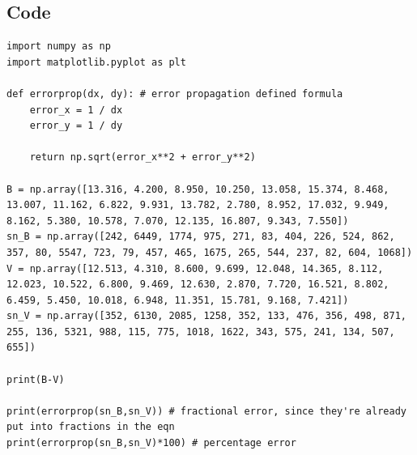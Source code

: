 \documentclass[12pt]{article}
\begin{document}
\subsection*{Code}

%

\begin{minipage}{\linewidth}
\captionsetup{hypcap=false}

\begin{mintedbox}
\begin{verbatim}
import numpy as np
import matplotlib.pyplot as plt

def errorprop(dx, dy): # error propagation defined formula
    error_x = 1 / dx
    error_y = 1 / dy

    return np.sqrt(error_x**2 + error_y**2)

B = np.array([13.316, 4.200, 8.950, 10.250, 13.058, 15.374, 8.468, 13.007, 11.162, 6.822, 9.931, 13.782, 2.780, 8.952, 17.032, 9.949, 8.162, 5.380, 10.578, 7.070, 12.135, 16.807, 9.343, 7.550])
sn_B = np.array([242, 6449, 1774, 975, 271, 83, 404, 226, 524, 862, 357, 80, 5547, 723, 79, 457, 465, 1675, 265, 544, 237, 82, 604, 1068])
V = np.array([12.513, 4.310, 8.600, 9.699, 12.048, 14.365, 8.112, 12.023, 10.522, 6.800, 9.469, 12.630, 2.870, 7.720, 16.521, 8.802, 6.459, 5.450, 10.018, 6.948, 11.351, 15.781, 9.168, 7.421])
sn_V = np.array([352, 6130, 2085, 1258, 352, 133, 476, 356, 498, 871, 255, 136, 5321, 988, 115, 775, 1018, 1622, 343, 575, 241, 134, 507, 655])

print(B-V)

print(errorprop(sn_B,sn_V)) # fractional error, since they're already put into fractions in the eqn
print(errorprop(sn_B,sn_V)*100) # percentage error

\end{verbatim}
\end{mintedbox}

\end{minipage}

%
\end{document}

